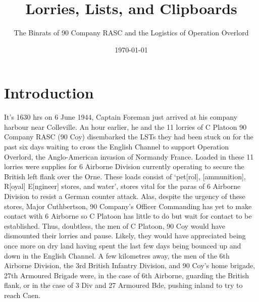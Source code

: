 \documentclass[noraggedright]{turabian-researchpaper}
\title{Lorries, Lists, and Clipboards}
\subtitle{The Binrats of 90 Company RASC and the Logistics of Operation 
Overlord}
\date{\today} %
\author{}
\begin{document}
\maketitle

\section{Introduction}



It's 1630 hrs on 6 June 1944, Captain Foreman just arrived at his company 
harbour near Colleville.  An hour earlier, he and the 11 lorries of C Platoon
90 Company RASC (90 Coy) disembarked the LSTs they had been stuck on for the 
past six days waiting to cross the English Channel to support Operation 
Overlord, the Anglo-American invasion of Normandy 
France.\autocite[1--6 June 1944]{90wd}  Loaded in these 
11 lorries were supplies for 6 Airborne Division currently operating to secure 
the British left flank over the Orne.  These loads consist of `pet[rol], 
[ammunition], R[oyal] E[ngineer] stores, and water', stores vital for the 
paras of 6 Airborne Division to resist a German counter 
attack.\autocite[S \& T Report (June History Report) p 4]{90wd} 
Alas, despite the urgency of these stores, Major Cuthbertson, 90 Company's 
Officer Commanding has yet to make contact with 6 Airborne so C Platoon has 
little to do but wait for contact to be 
established.\autocite[6 June 1944]{90wd}
Thus, doubtless, the men of C Platoon, 90 Coy would have dismounted their 
lorries and pause.  Likely, they would have appreciated being once more
on dry land having spent the last few days being bounced up and down in the
English Channel.  A few kilometres away, the men of the 6th Airborne Division,
the 3rd British Infantry Division, and 90 Coy's home brigade, 27th Armoured
Brigade were, in the case of 6th Airborne, guarding the British flank, or
in the case of 3 Div and 27 Armoured Bde, pushing inland to try to reach
Caen.
\end{document}
